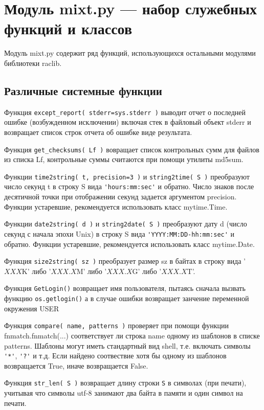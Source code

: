\section{Модуль {\sf mixt.py} --- набор служебных функций и классов}
Модуль {\sf mixt.py} содержит ряд функций, использующихся остальными модулями
библиотеки {\sf raclib}.

\subsection{Различные системные функции}
Функция \verb'except_report( stderr=sys.stderr )' выводит отчет о последней
ошибке (возбужденном исключении) включая стек в файловый объект {\sf stderr} и возвращает
список строк отчета об ошибке виде результата. 

Функция \verb'get_checksums( Lf )' вовращает список контрольных сумм для
файлов из списка {\sf Lf}, контрольные суммы считаются при помощи утилиты {\sf
md5sum}.

Функции \verb'time2string( t, precision=3 )' и \verb'string2time( S )'
преобразуют число секунд {\sf t} в строку {\sf S} вида \verb|'hours:mm:sec'| и
обратно. Число знаков после десятичной точки при отображении секунд задается
аргументом {\sf precision}. Функции устаревшие, рекомендуется использовать класс {\sf mytime.Time}.

Функции \verb'date2string( d )' и \verb'string2date( S )'
преобразуют дату {\sf d} (число секунд  с начала эпохи {\sf Unix}) в строку {\sf S} вида \verb|'YYYY:MM:DD-hh:mm:sec'| и
обратно. Функции устаревшие, рекомендуется использовать класс {\sf mytime.Date}.

Функция \verb'size2string( sz )' преобразует размер {\sf sz} в байтах в строку
вида '$XXX${\sf K}' либо '$XXX.X${\sf M}' либо '$XXX.X${\sf G}' либо '$XXX.X${\sf T}'.

Функция \verb'GetLogin()' возвращает имя пользователя, пытаясь сначала вызвать
функцию \verb'os.getlogin()' а в случае ошибки возвращает занчение переменной
окружения {\sf USER}


Функция \verb'compare( name, patterns )' проверяет  при помощи функции {\sf
  fnmatch.fnmatch(...)} \cite{GVR} соответствует ли строка {\sf name} одному из
шаблонов в списке {\sf patterns}. Шаблоны могут иметь стандартный вид {\sf
  shell}, т.е. включать символы \verb|'*'|, \verb|'?'| и т.д. Если найдено соотвествие
хотя бы одному из шаблонов  возвращается {\sf True}, иначе возвращается {\sf False}.

Функция \verb'str_len( S )' возвращает длину строки \verb'S' в символах (при печати),
учитывая что символы {\sf utf-8} занимают два байта в памяти и один символ на
печати.

